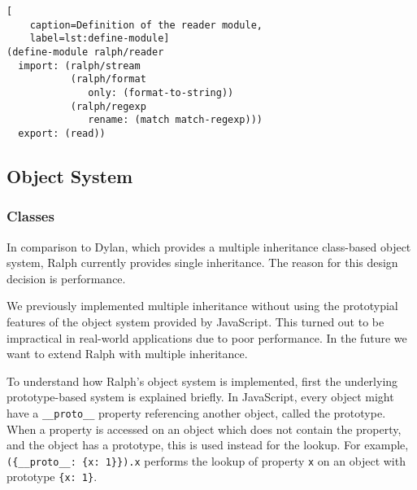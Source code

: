 \documentclass{acm_proc_article-sp}
\newcommand{\renvoi}[3][pos=0.5]{
\path (#2) -- (#3)coordinate[#1](mm);
\draw[line] (#2) -| (mm) |- (#3);
}
\begin{document}
\begin{lstlisting}[
    caption=Definition of the reader module,
    label=lst:define-module]
(define-module ralph/reader
  import: (ralph/stream
           (ralph/format
              only: (format-to-string))
           (ralph/regexp
              rename: (match match-regexp)))
  export: (read))
\end{lstlisting}


\subsection{Object System}

\subsubsection{Classes}

In comparison to Dylan, which provides a multiple inheritance
class-based object system, Ralph currently provides single
inheritance. The reason for this design decision is performance.

We previously implemented multiple inheritance without using
the prototypial features of the object system provided by
JavaScript. This turned out to be impractical in real-world
applications due to poor performance. In the future we want to extend
Ralph with multiple inheritance.

To understand how Ralph's object system is implemented, first the
underlying prototype-based system is explained briefly. In JavaScript,
every object might have a \lstinline{__proto__} property referencing
another object, called the prototype. When a property is accessed on
an object which does not contain the property, and the object has a
prototype, this is used instead for the lookup. For example,
\lstinline|({__proto__: {x: 1}}).x| performs the lookup of property
\texttt{x} on an object with prototype \lstinline|{x: 1}|.

\begin{center}
\end{center}
\end{document}
